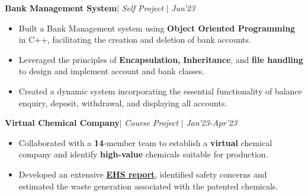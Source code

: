 \documentclass[10pt]{extarticle}
\begin{document}
\vspace{-4pt}
\begin{tcolorbox}[center, width=20.7cm, colback=black!10]
\textbf{Bank Management System}$|$ \textit{Self Project} $|$ \href{https://github.com/Amber404/BankMangementSystem}{\faGithub}
\hfill\hfill\textcolor{black!70}{\small \textit{Jun'23}}
\end{tcolorbox}
\vspace{-7pt}
\begin{itemize}
\item Built a Bank  Management system using \textbf{Object Oriented Programming} in C++, facilitating the creation and deletion of bank accounts.

\item  Leveraged the principles of \textbf{Encapsulation,} \textbf{Inheritance}, and \textbf{file handling} to design and implement account and bank classes.
\item Created a dynamic system incorporating the essential functionality of balance enquiry, deposit, withdrawal, and displaying all accounts.

\end{itemize}

\vspace{-4pt}
\begin{tcolorbox}[center, width=20.7cm, colback=black!10]
\textbf{Virtual Chemical Company}$|$ \textit{Course Project} $|$ \href{https://github.com/Amber404/Virtual-Chemical-Company}{\faGithub}
\hfill\hfill\textcolor{black!70}{\small \textit{Jan'23-Apr'23}}
\end{tcolorbox}
\vspace{-7pt}
\begin{itemize}
\item Collaborated with a \textbf{14}-member team to establish a \textbf{virtual }chemical company and identify \textbf{high-value} chemicals suitable for production.


\item Developed an extensive \textbf{{\underline{\href{https://drive.google.com/drive/folders/1VRu3LUcmlUA24VXeCF_O7jDyRVciGqLp}{EHS report}}}}, identified safety concerns and estimated the waste generation associated with the patented chemicals.

\end{itemize}
\end{document}
